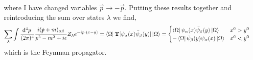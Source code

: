 \documentclass[12pt]{article}
\begin{document}
where I have changed variables $\vec{p} \to -\vec{p}$. Putting these results together and reintroducing the sum over states $\lambda$ we find,
\[ \sum_{\lambda} \int \frac{\mathrm{d}^{4} p \:}{(2 \pi)^4} \frac{ i (\slashed{p} + m)_{\alpha \beta}}{p^2 - m^2 + i \epsilon} Z_{\lambda} e^{-i p \cdot (x - y)} = \left< \Omega \right| \mathbf{T} [\psi_{\alpha}(x) \bar{\psi}_{\beta}(y)] \left| \Omega \right> = 
\begin{cases}
\left< \Omega \right| \psi_{\alpha}(x) \bar{\psi}_{\beta}(y) \left| \Omega \right> & x^0 > y^0 \\
- \left< \Omega \right| \bar{\psi}_{\beta}(y) \psi_{\alpha}(x) \left| \Omega \right> & x^0 < y^0
\end{cases}\]
which is the Feynman propagator.
\end{document}
